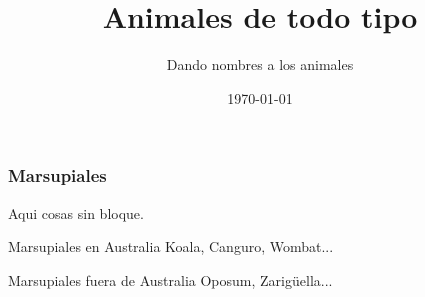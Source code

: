 \documentclass{beamer}
\title[Animales]{Animales de todo tipo}
\subtitle{Dando nombres a los animales}
\date{\today}
\begin{document}
\frame{\titlepage}

\begin{frame}
  \frametitle{Marsupiales}
  
  Aqui cosas sin bloque.
  
  \begin{block}{Marsupiales en Australia}
  Koala, Canguro, Wombat...
  \end{block}
      
  \begin{block}{Marsupiales fuera de Australia}
  Oposum, Zarig\"uella...
  \end{block}
\end{frame}
\end{document}
